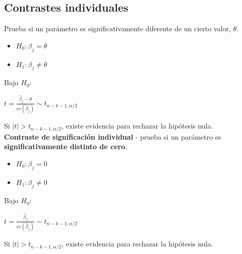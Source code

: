 \documentclass[10pt, a4paper, landscape]{extarticle}
\begin{document}
\begin{multicols}{3}
	\subsection*{Contrastes individuales}
		Prueba si un parámetro es significativamente diferente de un cierto valor, $\theta$.
		\begin{itemize}[leftmargin=*]
			\item $H_0: \beta_j = \theta$
			\item $H_1: \beta_j \neq \theta$
		\end{itemize}
		Bajo $H_0$:
		\begin{center}
			$t = \frac{\hat{\beta}_j - \theta}{ee(\hat{\beta}_j)} \sim t_{n-k-1, \alpha/2}$
		\end{center}
		Si $\mid t \mid > t_{n-k-1, \alpha/2}$, existe evidencia para rechazar la hipótesis nula.
		\\ \textbf{Contraste de significación individual} - prueba si un parámetro es \textbf{significativamente distinto de cero}.
		\begin{itemize}[leftmargin=*]
			\item $H_0: \beta_j = 0$
			\item $H_1: \beta_j \neq 0$
		\end{itemize}
		Bajo $H_0$:
		\begin{center}
			$t = \frac{\hat{\beta}_j}{ee(\hat{\beta}_j)} \sim t_{n-k-1, \alpha/2}$
		\end{center}
		Si $\mid t \mid > t_{n-k-1, \alpha/2}$, existe evidencia para rechazar la hipótesis nula.

\end{multicols}
\end{document}

